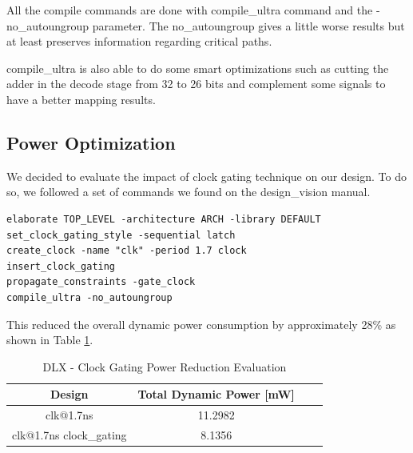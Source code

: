 \documentclass[12pt]{article}
\begin{document}
All the compile commands are done with compile\_ultra command and the -no\_autoungroup parameter. The no\_autoungroup gives a little worse results but at least preserves information regarding critical paths.

compile\_ultra is also able to do some smart optimizations such as cutting the adder in the decode stage from 32 to 26 bits and complement some signals to have a better mapping results.

\subsection{Power Optimization}
We decided to evaluate the impact of clock gating technique on our design. To do so, we followed a set of commands we found on the design\_vision manual.
\begin{minipage}{\linewidth}
\begin{lstlisting}
elaborate TOP_LEVEL -architecture ARCH -library DEFAULT
set_clock_gating_style -sequential latch
create_clock -name "clk" -period 1.7 clock
insert_clock_gating
propagate_constraints -gate_clock
compile_ultra -no_autoungroup
\end{lstlisting}
\end{minipage}


This reduced the overall dynamic power consumption by approximately 28\% as shown in Table \ref{POWERTABLE}.

	
\begin{table}[h]
	\begin{center}
	\begin{tabular}{ | c | c | c | c |}
		\hline
		\rowcolor{LimeGreen}Design &Total Dynamic Power [mW]\\ \hline
		clk@1.7ns & 11.2982 \\ \hline
		clk@1.7ns clock\_gating & 8.1356 \\ \hline
	\end{tabular}
		\caption{DLX - Clock Gating Power Reduction Evaluation}
		\label{POWERTABLE}
	\end{center}
\end{table}
\end{document}
